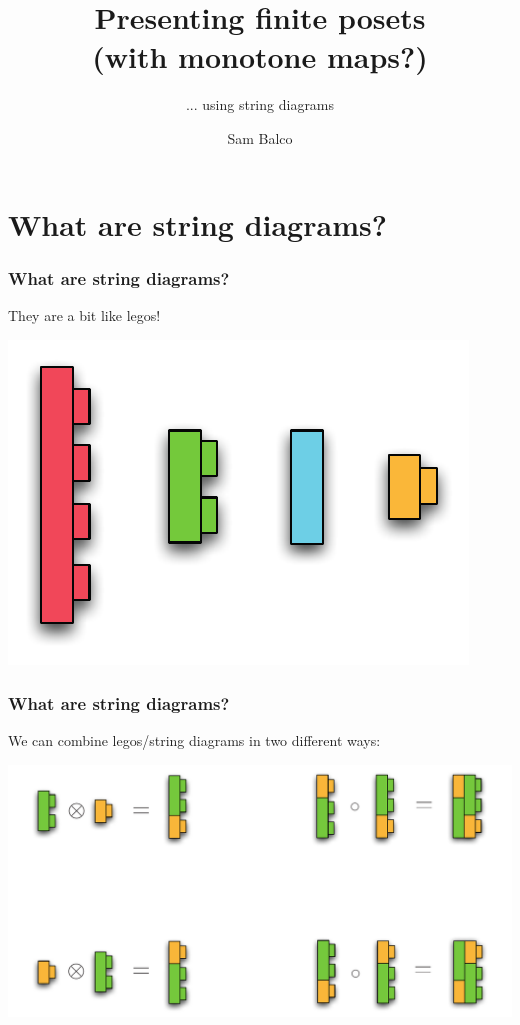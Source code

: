 \documentclass[t, pdftex]{beamer}
\title{Presenting finite posets \\(with monotone maps?)}
\subtitle{... using string diagrams}
\author{Sam Balco}
\date{\displaydate{date}}
\begin{document}
\titleframe


\section{What are string diagrams?}

\begin{frame}
    \frametitle{What are string diagrams?}
    They are a bit like legos!
    \begin{center}
        \includegraphics{figures/lego.pdf}
    \end{center}
\end{frame}

\begin{frame}
    \frametitle{What are string diagrams?}
    We can combine legos/string diagrams in two different ways:
    \begin{center}
        \includegraphics[width=\textwidth,keepaspectratio]{figures/lego2.pdf}
    \end{center}
\end{frame}
\end{document}
